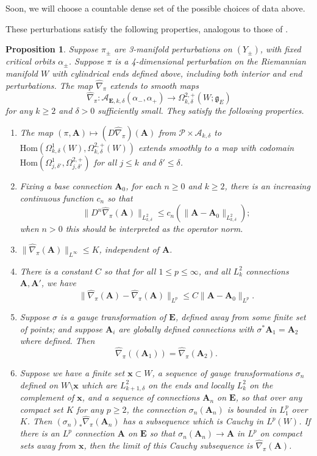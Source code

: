 \documentclass{memo-l}
\newtheorem{proposition}[theorem]{Proposition}
\theoremstyle{definition}
\theoremstyle{remark}
\numberwithin{section}{chapter}
\numberwithin{equation}{chapter}
\begin{document}
Soon, we will choose a countable dense set of the possible choices of data above.

These perturbations satisfy the following properties, analogous to those of \cite[Proposition~3.7]{KM1}.%

\begin{proposition}\label{pertfacts}Suppose $\pi_\pm$ are 3-manifold perturbations on $(Y_\pm)$, with fixed critical orbits $\alpha_\pm$. 
Suppose $\pi$ is a 4-dimensional perturbation on the Riemannian manifold $W$ with cylindrical ends defined above, including both interior and end perturbations. The map $\widehat{\nabla}_\pi$ extends to smooth maps $$\widehat{\nabla}_\pi: \mathcal A_{\mathbf{E},k,\delta}(\alpha_-, \alpha_+) \to \Omega^{2,+}_{k,\delta}(W;\mathfrak g_E)$$ for any $k \geq 2$ and $\delta > 0$ sufficiently small. They satisfy the following properties. 
\begin{enumerate}
\item The map $(\pi, \mathbf A) \mapsto (D\widehat{\nabla}_\pi)(\mathbf A)$ from $\mathcal P \times \mathcal A_{k,\delta}$ to $\text{Hom}\left(\Omega^1_{k,\delta}(W), \Omega^{2,+}_{k,\delta}(W)\right)$ extends smoothly to a map with codomain $\text{Hom}(\Omega^1_{j,\delta'}, \Omega^{2,+}_{j,\delta'})$ for all $j \le k$ and $\delta' \le \delta$.
\item Fixing a base connection $\mathbf{A}_0$, for each $n \geq 0$ and $k \geq 2$, there is an increasing continuous function $c_n$ so that $$\|D^n\widehat \nabla_\pi(\mathbf{A})\|_{L^2_{k,\delta}} \leq c_n\left(\|\mathbf{A}-\mathbf{A}_0\|_{L^2_{k,\delta}}\right);$$ when $n > 0$ this should be interpreted as the operator norm.
\item $\|\widehat{\nabla}_\pi(\mathbf{A})\|_{L^\infty} \leq K$, independent of $\mathbf{A}$. 
\item There is a constant $C$ so that for all $1 \leq p \leq \infty$, and all $L^2_k$ connections $\mathbf{A}, \mathbf{A}'$, we have 
$$\|\widehat{\nabla}_\pi(\mathbf{A}) - \widehat{\nabla}_\pi(\mathbf{A})\|_{L^p} \leq C\|\mathbf{A} - \mathbf{A}_0\|_{L^p}.$$
\item Suppose $\sigma$ is a gauge transformation of $\mathbf{E}$, defined away from some finite set of points; and suppose $\mathbf{A}_i$ are globally defined connections with $\sigma^*\mathbf{A}_1 = \mathbf{A}_2$ where defined. Then $$\widehat{\nabla}_\pi((\mathbf{A}_1)) = \widehat{\nabla}_\pi(\mathbf{A}_2).$$
\item Suppose we have a finite set $\mathbf{x} \subset W$, a sequence of gauge transformations $\sigma_n$ defined on $W \setminus \mathbf{x}$ which are $L^2_{k+1,\delta}$ on the ends and locally $L^2_k$ on the complement of $\mathbf{x}$, and a sequence of connections $\mathbf{A}_n$ on $\mathbf{E}$, so that over any compact set $K$ for any $p \geq 2$, the connection $\sigma_n(\mathbf{A}_n)$ is bounded in $L^p_1$ over $K$. Then $(\sigma_n)_* \widehat{\nabla}_\pi(\mathbf{A}_n)$ has a subsequence which is Cauchy in $L^p(W)$. If there is an $L^p$ connection $\mathbf{A}$ on $\mathbf{E}$ so that $\sigma_n(\mathbf{A}_n) \to \mathbf{A}$ in $L^p$ on compact sets away from $\mathbf{x}$, then the limit of this Cauchy subsequence is $\widehat{\nabla}_\pi(\mathbf{A})$.

\end{enumerate}
\end{proposition}
\end{document}
